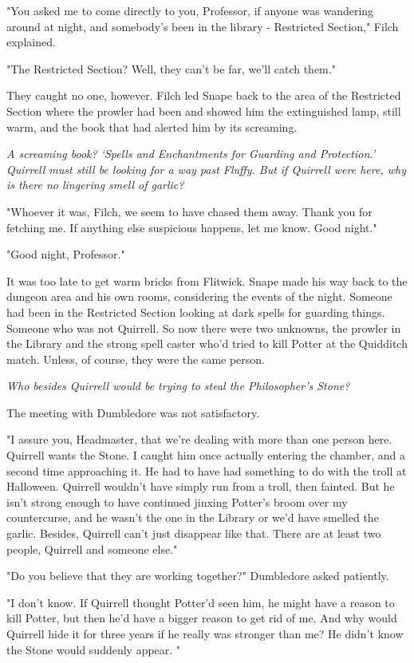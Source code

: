 "You asked me to come directly to you, Professor, if anyone was wandering around at night, and somebody's been in the library - Restricted Section," Filch explained.

"The Restricted Section? Well, they can't be far, we'll catch them."

They caught no one, however. Filch led Snape back to the area of the Restricted Section where the prowler had been and showed him the extinguished lamp, still warm, and the book that had alerted him by its screaming.

\emph{A screaming book? `Spells and Enchantments for Guarding and Protection.' Quirrell must still be looking for a way past Fluffy. But if Quirrell were here, why is there no lingering smell of garlic?}

"Whoever it was, Filch, we seem to have chased them away. Thank you for fetching me. If anything else suspicious happens, let me know. Good night."

"Good night, Professor."

It was too late to get warm bricks from Flitwick. Snape made his way back to the dungeon area and his own rooms, considering the events of the night. Someone had been in the Restricted Section looking at dark spells for guarding things. Someone who was not Quirrell. So now there were two unknowns, the prowler in the Library and the strong spell caster who'd tried to kill Potter at the Quidditch match. Unless, of course, they were the same person.

\emph{Who besides Quirrell would be trying to steal the Philosopher's Stone?}

The meeting with Dumbledore was not satisfactory.

"I assure you, Headmaster, that we're dealing with more than one person here. Quirrell wants the Stone. I caught him once actually entering the chamber, and a second time approaching it. He had to have had something to do with the troll at Halloween. Quirrell wouldn't have simply run from a troll, then fainted. But he isn't strong enough to have continued jinxing Potter's broom over my countercurse, and he wasn't the one in the Library or we'd have smelled the garlic. Besides, Quirrell can't just disappear like that. There are at least two people, Quirrell and someone else."

"Do you believe that they are working together?" Dumbledore asked patiently.

"I don't know. If Quirrell thought Potter'd seen him, he might have a reason to kill Potter, but then he'd have a bigger reason to get rid of me. And why would Quirrell hide it for three years if he really was stronger than me? He didn't know the Stone would suddenly appear. "

